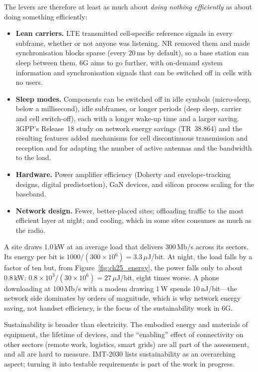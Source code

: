 The levers are therefore at least as much about \emph{doing nothing efficiently} as about doing
something efficiently:
\begin{itemize}
\item \textbf{Lean carriers.} LTE transmitted cell-specific reference signals in every subframe,
whether or not anyone was listening. NR removed them and made synchronisation blocks sparse
(every 20\,ms by default), so a base station can sleep between them. 6G aims to go further, with
on-demand system information and synchronisation signals that can be switched off in cells with no
users.
\item \textbf{Sleep modes.} Components can be switched off in idle symbols (micro-sleep, below a
millisecond), idle subframes, or longer periods (deep sleep, carrier and cell switch-off), each with
a longer wake-up time and a larger saving. 3GPP's Release~18 study on network energy savings (TR~38.864)
and the resulting features added mechanisms for cell discontinuous transmission and reception and for
adapting the number of active antennas and the bandwidth to the load.
\item \textbf{Hardware.} Power amplifier efficiency (Doherty and envelope-tracking designs,
digital predistortion), GaN devices, and silicon process scaling for the baseband.
\item \textbf{Network design.} Fewer, better-placed sites; offloading traffic to the most efficient
layer at night; and cooling, which in some sites consumes as much as the radio.
\end{itemize}

\begin{worked}
A site draws 1.0\,kW at an average load that delivers 300\,Mb/s across its sectors. Its energy per bit
is $1000/(300\times10^6)=3.3\,\mu$J/bit. At night, the load falls by a factor of ten but, from
Figure~\ref{fig:ch25_energy}, the power falls only to about 0.8\,kW: $0.8\times10^3/(30\times10^6)=27\,
\mu$J/bit, eight times worse. A phone downloading at 100\,Mb/s with a modem drawing 1\,W spends
10\,nJ/bit---the network side dominates by orders of magnitude, which is why network energy saving,
not handset efficiency, is the focus of the sustainability work in 6G.
\end{worked}

Sustainability is broader than electricity. The embodied energy and materials of equipment, the
lifetime of devices, and the ``enabling'' effect of connectivity on other sectors (remote work,
logistics, smart grids) are all part of the assessment, and all are hard to measure. IMT-2030 lists
sustainability as an overarching aspect; turning it into testable requirements is part of the work
in progress.

